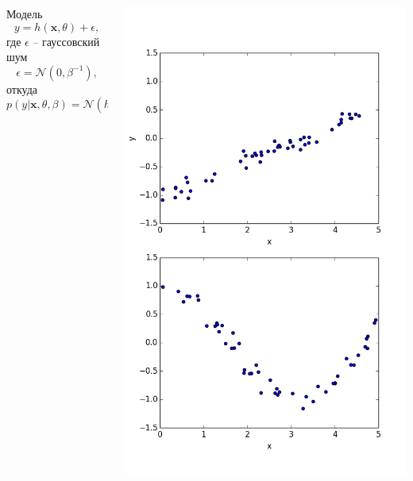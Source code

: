 \documentclass[10pt]{beamer}
\begin{document}
\begin{frame}{}

\begin{columns}[C]
    \begin{column}{.55\textwidth}
    	Модель
		\[
			y = h(\mathbf{x}, \theta) + \epsilon,
		\]
		где $\epsilon$ -- гауссовский шум
		\[
			\epsilon = \mathcal{N}(0, \beta^{-1}),
		\]
		откуда
		\[
		p(y | \mathbf{x}, \theta, \beta) = \mathcal{N}( h(\mathbf{x}, \theta), \beta^{-1})
		\]
    \end{column}
       
    \begin{column}{.45\textwidth}
	\begin{center}
   		\includegraphics[scale=0.3]{images/empty_reg.png}
    \end{center}
    \end{column}
  \end{columns}

\end{frame}
\end{document}
